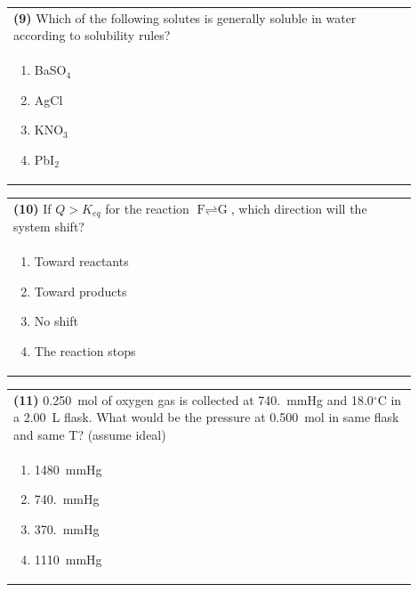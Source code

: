 \documentclass{article}
\begin{document}
\noindent\begin{tabular}{|p{0.9\linewidth}|}
\hline
\textbf{(9)} Which of the following solutes is generally soluble in water according to solubility rules?\\[0.2cm]
\begin{minipage}[t]{0.85\linewidth}
\begin{enumerate}[label=\alph*.]
\item BaSO$_4$
\item AgCl
\item KNO$_3$
\item PbI$_2$
\end{enumerate}
\end{minipage}\\[0.2cm]
\hline
\end{tabular}

\noindent\begin{tabular}{|p{0.9\linewidth}|}
\hline
\textbf{(10)} If $Q > K_{eq}$ for the reaction $\text{F} \rightleftharpoons \text{G}$, which direction will the system shift?\\[0.2cm]
\begin{minipage}[t]{0.85\linewidth}
\begin{enumerate}[label=\alph*.]
\item Toward reactants
\item Toward products
\item No shift
\item The reaction stops
\end{enumerate}
\end{minipage}\\[0.2cm]
\hline
\end{tabular}

\noindent\begin{tabular}{|p{0.9\linewidth}|}
\hline
\textbf{(11)} 0.250~mol of oxygen gas is collected at 740.~mmHg and 18.0$^\circ$C in a 2.00~L flask. What would be the pressure at 0.500~mol in same flask and same T? (assume ideal)\\[0.2cm]

\begin{minipage}[t]{0.85\linewidth}
\begin{enumerate}[label=\alph*.]
\item 1480~mmHg
\item 740.~mmHg
\item 370.~mmHg
\item 1110~mmHg
\end{enumerate}
\end{minipage}\\[0.2cm]
\hline
\end{tabular}
\end{document}
